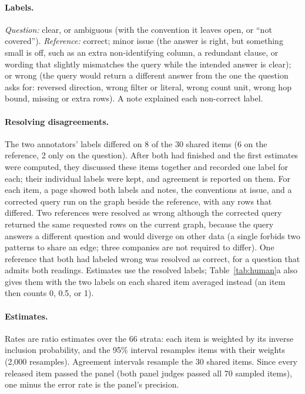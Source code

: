 \paragraph{Labels.} \emph{Question:} clear, or ambiguous (with the convention it leaves open, or ``not covered''). \emph{Reference:} correct; minor issue (the answer is right, but something small is off, such as an extra non-identifying column, a redundant clause, or wording that slightly mismatches the query while the intended answer is clear); or wrong (the query would return a different answer from the one the question asks for: reversed direction, wrong filter or literal, wrong count unit, wrong hop bound, missing or extra rows). A note explained each non-correct label.

\paragraph{Resolving disagreements.} The two annotators' labels differed on 8 of the 30 shared items (6 on the reference, 2 only on the question). After both had finished and the first estimates were computed, they discussed these items together and recorded one label for each; their individual labels were kept, and agreement is reported on them. For each item, a page showed both labels and notes, the conventions at issue, and a corrected query run on the graph beside the reference, with any rows that differed. Two references were resolved as wrong although the corrected query returned the same requested rows on the current graph, because the query answers a different question and would diverge on other data (a single  forbids two patterns to share an edge; three companies are not required to differ). One reference that both had labeled wrong was resolved as correct, for a question that admits both readings. Estimates use the resolved labels; Table~\ref{tab:human}a also gives them with the two labels on each shared item averaged instead (an item then counts 0, 0.5, or 1).

\paragraph{Estimates.} Rates are ratio estimates over the 66 strata: each item is weighted by its inverse inclusion probability, and the 95\% interval resamples items with their weights (2,000 resamples). Agreement intervals resample the 30 shared items. Since every released item passed the panel (both panel judges passed all 70 sampled items), one minus the error rate is the panel's precision.

